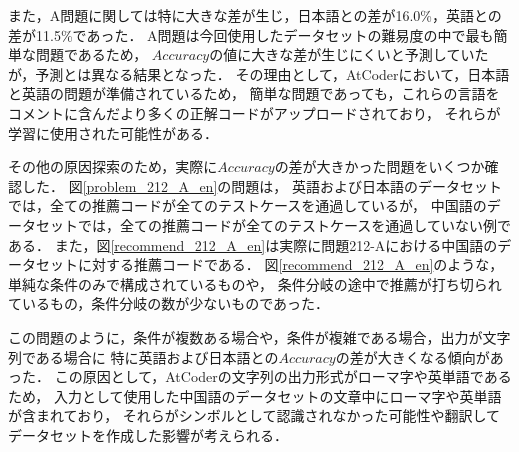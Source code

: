  また，A問題に関しては特に大きな差が生じ，日本語との差が16.0\%，英語との差が11.5\%であった．
  A問題は今回使用したデータセットの難易度の中で最も簡単な問題であるため，
  $Accuracy$の値に大きな差が生じにくいと予測していたが，予測とは異なる結果となった．
  その理由として，AtCoder\cite{AtCoder}において，日本語と英語の問題が準備されているため，
  簡単な問題であっても，これらの言語をコメントに含んだより多くの正解コードがアップロードされており，
  それらが学習に使用された可能性がある．

  その他の原因探索のため，実際に$Accuracy$の差が大きかった問題をいくつか確認した．
  図\ref{problem_212_A_en}の問題は，
  英語および日本語のデータセットでは，全ての推薦コードが全てのテストケースを通過しているが，
  中国語のデータセットでは，全ての推薦コードが全てのテストケースを通過していない例である．
  また，図\ref{recommend_212_A_en}は実際に問題212-Aにおける中国語のデータセットに対する推薦コードである．
  図\ref{recommend_212_A_en}のような，単純な条件のみで構成されているものや，
  条件分岐の途中で推薦が打ち切られているもの，条件分岐の数が少ないものであった．
  
  この問題のように，条件が複数ある場合や，条件が複雑である場合，出力が文字列である場合に
  特に英語および日本語との$Accuracy$の差が大きくなる傾向があった．
  この原因として，AtCoderの文字列の出力形式がローマ字や英単語であるため，
  入力として使用した中国語のデータセットの文章中にローマ字や英単語が含まれており，
  それらがシンボルとして認識されなかった可能性や翻訳してデータセットを作成した影響が考えられる．